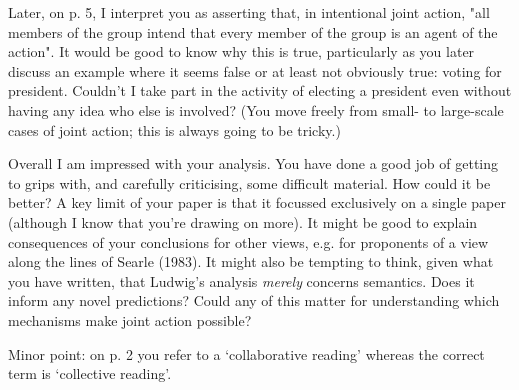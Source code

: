 \documentclass[12pt,a4paper]{extarticle}
\begin{document}
Later, on p. 5, I interpret you as asserting that, in intentional joint action, "all members of the group intend that every member of the group is an agent of the action".  It would be good to know why this is true, particularly as you later discuss an example where it seems false or at least not obviously true: voting for president.  Couldn't I take part in the activity of electing a president even without having any idea who else is involved?  (You move freely from small- to large-scale cases of joint action; this is always going to be tricky.)

Overall I am impressed with your analysis.  You have done a good job of getting to grips with, and carefully criticising, some difficult material.  How could it be better?  A key limit of your paper is that it focussed exclusively on a single paper (although I know that you're drawing on more).  It might be good to explain consequences of your conclusions for other views, e.g. for proponents of a view along the lines of Searle (1983).  It might also be tempting to think, given what you have written, that Ludwig's analysis \emph{merely} concerns semantics.  Does it inform any novel predictions?  Could any of this matter for understanding which mechanisms make joint action possible?

Minor point: on p. 2 you refer to a `collaborative reading' whereas the correct term is `collective reading'.


\small

\end{document}

